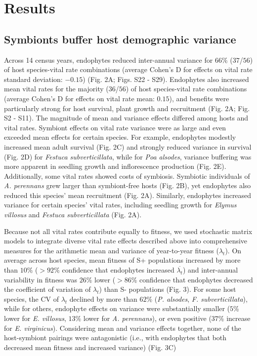 \documentclass[lineno, sn-basic]{sn-jnl}%
\begin{document}
\section*{Results}
\subsection*{Symbionts buffer host demographic variance}

Across 14 census years, endophytes reduced inter-annual variance for 66\% ($37$/$56$) of host species-vital rate combinations (average Cohen's D for effects on vital rate standard deviation: $-0.15$) (Fig. 2A; Figs. S22 -  S29). 
Endophytes also increased mean vital rates for the majority ($36$/$56$) of host species-vital rate combinations (average Cohen's D for effects on vital rate mean: $0.15$), and benefits were particularly strong for host survival, plant growth and recruitment (Fig. 2A; Fig. S2 - S11).
The magnitude of mean and variance effects differed among hosts and vital rates. 
Symbiont effects on vital rate variance were as large and even exceeded mean effects for certain species.
For example, endophytes modestly increased mean adult survival (Fig. 2C) and strongly reduced variance in survival (Fig. 2D) for \emph{Festuca subverticillata}, while for \emph{Poa alsodes}, variance buffering was more apparent in seedling growth and inflorescence production (Fig. 2E). 
Additionally, some vital rates showed costs of symbiosis. 
Symbiotic individuals of \emph{A. perennans} grew larger than symbiont-free hosts (Fig. 2B), yet endophytes also reduced this species' mean recruitment (Fig. 2A). 
Similarly, endophytes increased variance for certain species' vital rates, including seedling growth for \emph{Elymus villosus} and \emph{Festuca subverticillata} (Fig. 2A).


Because not all vital rates contribute equally to fitness, we used stochastic matrix models to integrate diverse vital rate effects described above into comprehensive measures for the arithmetic mean and variance of year-to-year fitness ($\lambda_{t}$).
On average across host species, mean fitness of S+ populations increased by more than $10\%$ ($>92$\% confidence that endophytes increased $\overline{\lambda_{t}}$) and inter-annual variability in fitness was $26\%$ lower ($>86$\% confidence that endophytes decreased the coefficient of variation of $\lambda_{t}$) than S- populations (Fig. 3).
For some host species, the CV of $\lambda_{t}$ declined by more than $62$\% (\emph{P. alsodes}, \emph{F. subverticillata}), while for others, endophyte effects on variance were substantially smaller ($5$\% lower for \emph{E. villosus}, $13$\% lower for \emph{A. perennans}), or even positive ($37$\% increase for \emph{E. virginicus}).
Considering mean and variance effects together, none of the host-symbiont pairings were antagonistic (i.e., with endophytes that both decreased mean fitness and increased variance) (Fig. 3C)
\end{document}
